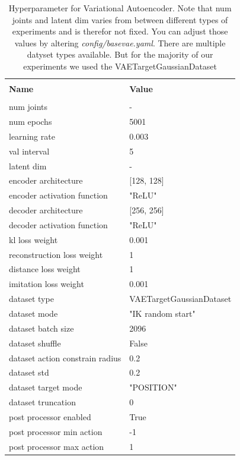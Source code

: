 \begin{table}
    \label{tab:VAE_Hyperparameters}
    \begin{center}
        \begin{tabular}{ l | l }
        \hline \\
        \textbf{Name} & \textbf{Value} \\
        \hline \\
        num joints & - \\
        num epochs & 5001 \\
        learning rate & 0.003 \\
        val interval & 5 \\
        latent dim & - \\
        encoder architecture & [128, 128] \\
        encoder activation function & "ReLU" \\
        decoder architecture & [256, 256] \\
        decoder activation function & "ReLU" \\
        kl loss weight & 0.001 \\
        reconstruction loss weight & 1 \\
        distance loss weight & 1 \\
        imitation loss weight & 0.001 \\
        dataset type & VAETargetGaussianDataset \\
        dataset mode & "IK random start" \\
        dataset batch size & 2096 \\
        dataset shuffle & False \\
        dataset action constrain radius & 0.2 \\
        dataset std & 0.2 \\
        dataset target mode & "POSITION" \\
        dataset truncation & 0  \\
        post processor enabled & True \\
        post processor min action & -1 \\
        post processor max action & 1 
        \end{tabular}
    \end{center}
    \caption[VAE Hyperparameter]{Hyperparameter for Variational Autoencoder. Note that num joints and latent dim varies from between different types of experiments and is therefor not fixed. You can adjust those values by altering \textit{config/base\textunderscore vae.yaml}. There are multiple datyset types available. But for the majority of our experiments we used the VAETargetGaussianDataset}
\end{table}

